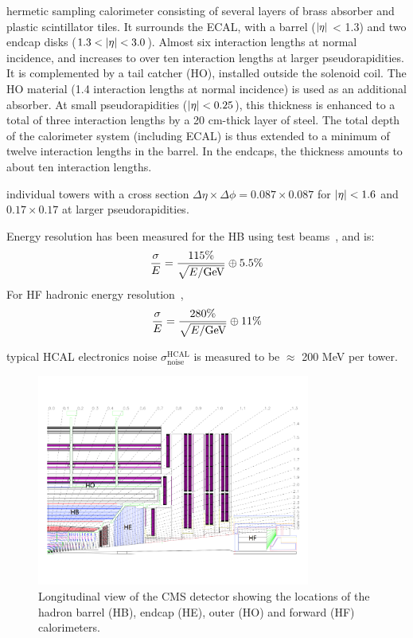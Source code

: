 hermetic sampling calorimeter consisting of several layers of brass absorber and plastic scintillator tiles. It surrounds the ECAL, with a barrel ($\lvert\eta\rvert$ < 1.3) and two endcap disks ($1.3 < \lvert\eta\rvert < 3.0$).
Almost six interaction lengths at normal incidence, and increases to over ten interaction lengths at larger pseudorapidities.
It is complemented by a tail catcher (HO), installed outside the solenoid coil. The HO material 
(1.4 interaction lengths at normal incidence) is used as an additional absorber. At small pseudorapidities ($\lvert\eta\rvert < 0.25$), 
this thickness is enhanced to a total of three interaction lengths by a 20 cm-thick layer of steel. 
The total depth of the calorimeter system (including ECAL) is thus extended to a minimum of 
twelve interaction lengths in the barrel. In the endcaps, the thickness amounts to about ten interaction lengths.

individual towers with a cross section $\Delta\eta \times \Delta\phi = 0.087 \times 0.087$ for $\lvert\eta\rvert < 1.6$ 
and $0.17 \times 0.17$ at larger pseudorapidities.

Energy resolution has been measured for the HB using test beams~\cite{Elvira:800406}, and is:
\begin{equation}
\label{eqn:hcal_res}
\frac{\sigma}{E} = \frac{115\%}{\sqrt{E/\mathrm{GeV}}} \oplus 5.5\%
\end{equation}
For HF hadronic energy resolution~\cite{Baiatian:951395},
\begin{equation}
\label{eqn:hcal_res}
\frac{\sigma}{E} = \frac{280\%}{\sqrt{E/\mathrm{GeV}}} \oplus 11\%
\end{equation}

typical HCAL electronics noise $\sigma ^{\text{HCAL}} _{\text{noise}}$ is measured to be $\approx$ 200 MeV per tower.

\begin{figure}[htbp]
\centering
     \includegraphics[width=0.8\textwidth]{cms_and_lhc/plots/cms_hcal.pdf}
     \caption{
Longitudinal view of the CMS detector showing the locations of the hadron barrel (HB), endcap (HE), outer (HO) and forward (HF) calorimeters.
     }
     \label{fig:cms_hcal}
\end{figure}



